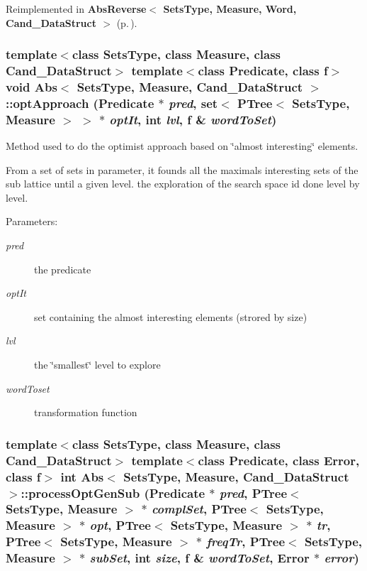 Reimplemented in {\bf Abs\-Reverse$<$ Sets\-Type, Measure, Word, Cand\_\-Data\-Struct $>$} {\rm (p.\,\pageref{class_abs_reverse_d4e6aa7d0f2e50db5d5e75ab5801fd51})}.
\subsubsection{\setlength{\rightskip}{0pt plus 5cm}template$<$class Sets\-Type, class Measure, class Cand\_\-Data\-Struct$>$ template$<$class Predicate, class f$>$ void {\bf Abs}$<$ Sets\-Type, Measure, Cand\_\-Data\-Struct $>$::opt\-Approach ({\bf Predicate} $\ast$ {\em pred}, set$<$ {\bf PTree}$<$ Sets\-Type, Measure $>$ $>$ $\ast$ {\em opt\-It}, int {\em lvl}, f \& {\em word\-To\-Set})\hspace{0.3cm}{\tt  [protected]}}\label{class_abs_61298c6d5b7e4ff5192b2a68c52b701a}


Method used to do the optimist approach based on \char`\"{}almost interesting\char`\"{} elements. 

From a set of sets in parameter, it founds all the maximals interesting sets of the sub lattice until a given level. the exploration of the search space id done level by level.

\begin{Desc}
\item[Parameters:]
\begin{description}
\item[{\em pred}]the predicate \item[{\em opt\-It}]set containing the almost interesting elements (strored by size) \item[{\em lvl}]the \char`\"{}smallest\char`\"{} level to explore \item[{\em word\-Toset}]transformation function \end{description}
\end{Desc}
\subsubsection{\setlength{\rightskip}{0pt plus 5cm}template$<$class Sets\-Type, class Measure, class Cand\_\-Data\-Struct$>$ template$<$class Predicate, class Error, class f$>$ int {\bf Abs}$<$ Sets\-Type, Measure, Cand\_\-Data\-Struct $>$::process\-Opt\-Gen\-Sub ({\bf Predicate} $\ast$ {\em pred}, {\bf PTree}$<$ Sets\-Type, Measure $>$ $\ast$ {\em compl\-Set}, {\bf PTree}$<$ Sets\-Type, Measure $>$ $\ast$ {\em opt}, {\bf PTree}$<$ Sets\-Type, Measure $>$ $\ast$ {\em tr}, {\bf PTree}$<$ Sets\-Type, Measure $>$ $\ast$ {\em freq\-Tr}, {\bf PTree}$<$ Sets\-Type, Measure $>$ $\ast$ {\em sub\-Set}, int {\em size}, f \& {\em word\-To\-Set}, Error $\ast$ {\em error})\hspace{0.3cm}{\tt  [protected]}}\label{class_abs_18e3c9003dca0c22177631287ce60aa5}


